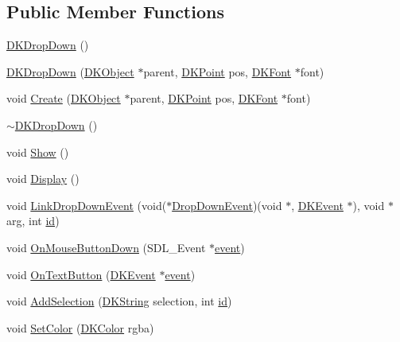 \subsection*{Public Member Functions}
\begin{DoxyCompactItemize}
\item 
\hyperlink{class_d_k_drop_down_a3270c98ad3850ec9cebd2343c455e08c}{D\-K\-Drop\-Down} ()
\item 
\hyperlink{class_d_k_drop_down_afb8bc658ad86f15b460a0add114416a1}{D\-K\-Drop\-Down} (\hyperlink{class_d_k_object}{D\-K\-Object} $\ast$parent, \hyperlink{_d_k_axis_8h_a0ca1f005fbb936f8e7a7f2433591f418}{D\-K\-Point} pos, \hyperlink{class_d_k_font}{D\-K\-Font} $\ast$font)
\item 
void \hyperlink{class_d_k_drop_down_a04b344d42d411e915a315a1c34760890}{Create} (\hyperlink{class_d_k_object}{D\-K\-Object} $\ast$parent, \hyperlink{_d_k_axis_8h_a0ca1f005fbb936f8e7a7f2433591f418}{D\-K\-Point} pos, \hyperlink{class_d_k_font}{D\-K\-Font} $\ast$font)
\item 
\hyperlink{class_d_k_drop_down_ac341238f5249d2f4dbd1a46d82d38b13}{$\sim$\-D\-K\-Drop\-Down} ()
\item 
void \hyperlink{class_d_k_drop_down_a105f4e29a7804d7ce114d26cda29e374}{Show} ()
\item 
void \hyperlink{class_d_k_drop_down_ab3134b858a9993164203583a487add10}{Display} ()
\item 
void \hyperlink{class_d_k_drop_down_a0206abcba4fca89418f660148d1ff1ea}{Link\-Drop\-Down\-Event} (void($\ast$\hyperlink{class_d_k_event_ac3a9913b5da26575a6729fda66f3122f}{Drop\-Down\-Event})(void $\ast$, \hyperlink{class_d_k_event}{D\-K\-Event} $\ast$), void $\ast$arg, int \hyperlink{class_d_k_event_a46877918e12fcb3b2c8988379b6fa6fa}{id})
\item 
void \hyperlink{class_d_k_drop_down_ae9aa3a5c3485758873de94361605d725}{On\-Mouse\-Button\-Down} (S\-D\-L\-\_\-\-Event $\ast$\hyperlink{class_d_k_event_a3deebb932ed734363c4ece87971bc45f}{event})
\item 
void \hyperlink{class_d_k_drop_down_a75441d4ee9ba0ff8b74502b51ad9641f}{On\-Text\-Button} (\hyperlink{class_d_k_event}{D\-K\-Event} $\ast$\hyperlink{class_d_k_event_a3deebb932ed734363c4ece87971bc45f}{event})
\item 
void \hyperlink{class_d_k_drop_down_a715a50ad436114f21a2d52fa70a73dfa}{Add\-Selection} (\hyperlink{_d_k_string_8h_ac168e8555ceba18e1a2919b21976bc84}{D\-K\-String} selection, int \hyperlink{class_d_k_event_a46877918e12fcb3b2c8988379b6fa6fa}{id})
\item 
void \hyperlink{class_d_k_drop_down_ae66aa1012726122e97d1ddece3517163}{Set\-Color} (\hyperlink{class_d_k_color}{D\-K\-Color} rgba)
\end{DoxyCompactItemize}
